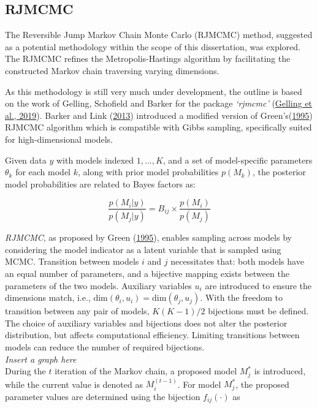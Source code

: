 \documentclass[
  11pt,
]{article}
\begin{document}
\subsection{RJMCMC}

The Reversible Jump Markov Chain Monte Carlo (RJMCMC) method, suggested
as a potential methodology within the scope of this dissertation, was
explored. The RJMCMC refines the Metropolis-Hastings algorithm by
facilitating the constructed Markov chain traversing varying dimensions.

As this methodology is still very much under development, the outline is
based on the work of Gelling, Schofield and Barker for the package
\emph{`rjmcmc'} (\protect\hyperlink{ref-Gelling2019}{Gelling et al.,
2019}). Barker and Link (\protect\hyperlink{ref-Barker2013}{2013})
introduced a modified version of
Green's(\protect\hyperlink{ref-Green1995}{1995}) RJMCMC algorithm which
is compatible with Gibbs sampling, specifically suited for
high-dimensional models.

Given data \(y\) with models indexed \(1,...,K\), and a set of
model-specific parameters \(\theta_k\) for each model \(k\), along with
prior model probabilities \(p(M_k)\), the posterior model probabilities
are related to Bayes factors as:

\begin{equation}
\frac{p(M_i|y)}{p(M_j|y)} = B_{ij} \times \frac{p(M_i)}{p(M_j)}
\end{equation}

\emph{RJMCMC}, as proposed by Green
(\protect\hyperlink{ref-Green1995}{1995}), enables sampling across
models by considering the model indicator as a latent variable that is
sampled using MCMC. Transition between models \(i\) and \(j\)
necessitates that: both models have an equal number of parameters, and a
bijective mapping exists between the parameters of the two models.
Auxiliary variables \(u_i\) are introduced to ensure the dimensions
match, i.e., \(\text{dim}(\theta_i,u_i) = \text{dim}(\theta_j,u_j)\).
With the freedom to transition between any pair of models, \(K(K-1)/2\)
bijections must be defined. The choice of auxiliary variables and
bijections does not alter the posterior distribution, but affects
computational efficiency. Limiting transitions between models can reduce
the number of required bijections.\\
\emph{Insert a graph here}\\
During the \(t\) iteration of the Markov chain, a proposed model
\(M_{j}^*\) is introduced, while the current value is denoted as
\(M_{i}^{(t-1)}\). For model \(M_{j}^*\), the proposed parameter values
are determined using the bijection \(f_{ij}(\cdot)\) as
\end{document}
